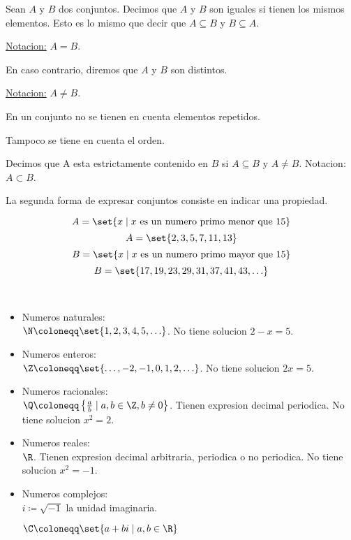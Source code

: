 \begin{definition}
	Sean \(A \) y \(B \) dos conjuntos. Decimos que \(A \) y \(B \) son iguales si tienen los mismos elementos. Esto es lo mismo que decir que \(A \subseteq B \) y \(B \subseteq A \).

	\underline{Notacion:} \(A = B \).

	En caso contrario, diremos que \(A \) y \(B \) son distintos.

	\underline{Notacion:} \(A \neq B \).
\end{definition}

\begin{remark}
	En un conjunto no se tienen en cuenta elementos repetidos.

	Tampoco se tiene en cuenta el orden.
\end{remark}
\begin{definition}
	Decimos que A esta estrictamente contenido en \(B \) si \(A \subseteq B \) y \(A \neq  B \).
	Notacion: \(A \subset B \).
\end{definition}

La segunda forma de expresar conjuntos consiste en indicar una propiedad.

\begin{example}
	\[
		A = \set{x \mid x \text{ es un numero primo menor que 15} }
	\]
	\[
		A = \set{2,3,5,7,11,13}
	\]
	\[
		B = \set{x \mid x \text{ es un numero primo mayor que 15} }
	\]
	\[
		B = \set{17,19,23,29,31,37,41,43,\ldots}
	\]
\end{example}

\begin{definition}
	~
	\begin{itemize}
		\item Numeros naturales: \\
		      \(\N \coloneqq \set{1,2,3,4,5,\ldots} \). No tiene solucion \(2 - x = 5 \).
		\item Numeros enteros: \\
		      \(\Z \coloneqq \set{\ldots,-2,-1,0,1,2,\ldots }\). No tiene solucion \(2x = 5 \).
		\item Numeros racionales: \\
		      \(\Q \coloneqq \left\{\frac{a}{b} \mid a,b \in \Z, b \neq 0 \right\}\). Tienen expresion decimal periodica. No tiene solucion \(x^{2} = 2 \).
		\item Numeros reales: \\
		      \(\R \). Tienen expresion decimal arbitraria, periodica o no periodica. No tiene solucion \(x^{2} = -1 \).
		\item Numeros complejos: \\
		      \(i \coloneqq \sqrt{-1} \) la unidad imaginaria.

		      \(\C \coloneqq \set{a + bi \mid a,b \in \R}\)
	\end{itemize}
\end{definition}

